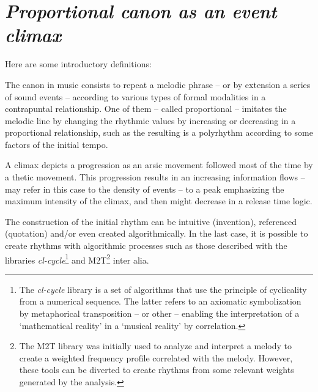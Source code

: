 
\section{\textsl{Proportional canon as an event climax}}

\label{imp2}

Here are some introductory definitions:

\smallskip

{The canon in music consists to repeat a melodic phrase -- or by extension a series of sound events -- according to various types of formal modalities in a contrapuntal relationship. One of them -- called proportional -- imitates the melodic line by changing the rhythmic values by increasing or decreasing in a proportional relationship, such as the resulting is a polyrhythm according to some factors of the initial tempo.}

{A climax depicts a progression as an arsic movement followed most of the time by a thetic movement. This progression results in an increasing information flows -- may refer in this case to the density of events -- to a peak emphasizing the maximum intensity of the climax, and then might decrease in a release time logic.}
  
  \bigskip

 The construction of the initial rhythm can be intuitive (invention), referenced (quotation) and/or even created algorithmically. In the last case, it is possible to create rhythms with algorithmic processes such as those described with the libraries \textsl{cl-cycle}\footnote{The \textsl{cl-cycle} library is a set of algorithms that use the principle of cyclicality from a numerical sequence. The latter refers to an axiomatic symbolization by metaphorical transposition -- or other -- enabling the interpretation of a `mathematical reality' in a `musical reality' by correlation.} and M2T\footnote{The M2T library was initially used to analyze and interpret a melody to create a weighted frequency profile correlated with the melody. However, these tools can be diverted to create rhythms from some relevant weights generated by the analysis.} inter alia.
  
\bigskip

